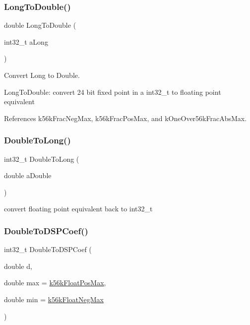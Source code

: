 \subsubsection{\texorpdfstring{LongToDouble()}{LongToDouble()}}
{\footnotesize\ttfamily double Long\+To\+Double (\begin{DoxyParamCaption}\item[{int32\+\_\+t}]{a\+Long }\end{DoxyParamCaption})\hspace{0.3cm}{\ttfamily [inline]}}



Convert Long to Double. 

Long\+To\+Double\+: convert 24 bit fixed point in a int32\+\_\+t to floating point equivalent 

References k56k\+Frac\+Neg\+Max, k56k\+Frac\+Pos\+Max, and k\+One\+Over56k\+Frac\+Abs\+Max.

\mbox{\label{a00449_a59b4dba8d35a4837ab0afe3886bec74a}} 
\subsubsection{\texorpdfstring{DoubleToLong()}{DoubleToLong()}}
{\footnotesize\ttfamily int32\+\_\+t Double\+To\+Long (\begin{DoxyParamCaption}\item[{double}]{a\+Double }\end{DoxyParamCaption})}



convert floating point equivalent back to int32\+\_\+t 

\mbox{\label{a00449_a1567c2393df9139b20166027d0127195}} 
\subsubsection{\texorpdfstring{DoubleToDSPCoef()}{DoubleToDSPCoef()}}
{\footnotesize\ttfamily int32\+\_\+t Double\+To\+D\+S\+P\+Coef (\begin{DoxyParamCaption}\item[{double}]{d,  }\item[{double}]{max = {\ttfamily \mbox{\hyperlink{a00449_abc7ad084f4b51c70feeac700ab05f7a5}{k56k\+Float\+Pos\+Max}}},  }\item[{double}]{min = {\ttfamily \mbox{\hyperlink{a00449_ae1518eaa8f13def92b4c9daeedbbe002}{k56k\+Float\+Neg\+Max}}} }\end{DoxyParamCaption})\hspace{0.3cm}{\ttfamily [inline]}}



